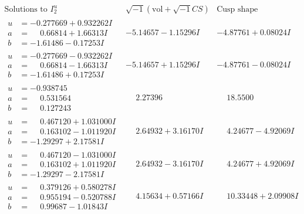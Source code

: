 \documentclass[1p]{elsarticle_modified}
\theoremstyle{definition}
\newcommand{\I}{\sqrt{-1}}
\begin{document}
$$\begin{array}{c|c|c}  
\text{Solutions to }I^u_{2}& \I (\text{vol} + \sqrt{-1}CS) & \text{Cusp shape}\\
 \hline 
\begin{aligned}
u &= -0.277669 + 0.932262 I \\
a &= \phantom{-}0.66814 + 1.66313 I \\
b &= -1.61486 - 0.17253 I\end{aligned}
 & -5.14657 - 1.15296 I & -4.87761 + 0.08024 I \\ \hline\begin{aligned}
u &= -0.277669 - 0.932262 I \\
a &= \phantom{-}0.66814 - 1.66313 I \\
b &= -1.61486 + 0.17253 I\end{aligned}
 & -5.14657 + 1.15296 I & -4.87761 - 0.08024 I \\ \hline\begin{aligned}
u &= -0.938745\phantom{ +0.000000I} \\
a &= \phantom{-}0.531564\phantom{ +0.000000I} \\
b &= \phantom{-}0.127243\phantom{ +0.000000I}\end{aligned}
 & \phantom{-}2.27396\phantom{ +0.000000I} & \phantom{-}18.5500\phantom{ +0.000000I} \\ \hline\begin{aligned}
u &= \phantom{-}0.467120 + 1.031000 I \\
a &= \phantom{-}0.163102 - 1.011920 I \\
b &= -1.29297 + 2.17581 I\end{aligned}
 & \phantom{-}2.64932 + 3.16170 I & \phantom{-}4.24677 - 4.92069 I \\ \hline\begin{aligned}
u &= \phantom{-}0.467120 - 1.031000 I \\
a &= \phantom{-}0.163102 + 1.011920 I \\
b &= -1.29297 - 2.17581 I\end{aligned}
 & \phantom{-}2.64932 - 3.16170 I & \phantom{-}4.24677 + 4.92069 I \\ \hline\begin{aligned}
u &= \phantom{-}0.379126 + 0.580278 I \\
a &= \phantom{-}0.955194 - 0.520788 I \\
b &= \phantom{-}0.99687 - 1.01843 I\end{aligned}
 & \phantom{-}4.15634 + 0.57166 I & \phantom{-}10.33448 + 2.09908 I \\ \hline\begin{aligned}

\end{aligned}
\end{array}$$
\end{document}
